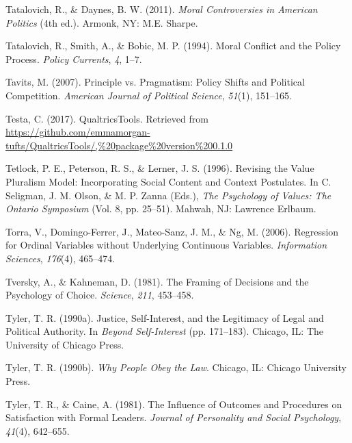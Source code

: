 \documentclass[12pt,econ]{sources/authesis}
\begin{document}
\leavevmode\hypertarget{ref-tatalovich_moral_2011}{}%
Tatalovich, R., \& Daynes, B. W. (2011). \emph{Moral Controversies in American Politics} (4th ed.). Armonk, NY: M.E. Sharpe.

\leavevmode\hypertarget{ref-tatalovich_moral_1994}{}%
Tatalovich, R., Smith, A., \& Bobic, M. P. (1994). Moral Conflict and the Policy Process. \emph{Policy Currents}, \emph{4}, 1--7.

\leavevmode\hypertarget{ref-tavits_2007_principle}{}%
Tavits, M. (2007). Principle vs. Pragmatism: Policy Shifts and Political Competition. \emph{American Journal of Political Science}, \emph{51}(1), 151--165.

\leavevmode\hypertarget{ref-testa_2017_qualtricstools}{}%
Testa, C. (2017). QualtricsTools. Retrieved from \url{https://github.com/emmamorgan-tufts/QualtricsTools/,\%20package\%20version\%200.1.0}

\leavevmode\hypertarget{ref-tetlock_1996_revising}{}%
Tetlock, P. E., Peterson, R. S., \& Lerner, J. S. (1996). Revising the Value Pluralism Model: Incorporating Social Content and Context Postulates. In C. Seligman, J. M. Olson, \& M. P. Zanna (Eds.), \emph{The Psychology of Values: The Ontario Symposium} (Vol. 8, pp. 25--51). Mahwah, NJ: Lawrence Erlbaum.

\leavevmode\hypertarget{ref-torra_2006_regression}{}%
Torra, V., Domingo-Ferrer, J., Mateo-Sanz, J. M., \& Ng, M. (2006). Regression for Ordinal Variables without Underlying Continuous Variables. \emph{Information Sciences}, \emph{176}(4), 465--474.

\leavevmode\hypertarget{ref-tversky_framing_1981}{}%
Tversky, A., \& Kahneman, D. (1981). The Framing of Decisions and the Psychology of Choice. \emph{Science}, \emph{211}, 453--458.

\leavevmode\hypertarget{ref-tyler_justice_1990}{}%
Tyler, T. R. (1990a). Justice, Self-Interest, and the Legitimacy of Legal and Political Authority. In \emph{Beyond Self-Interest} (pp. 171--183). Chicago, IL: The University of Chicago Press.

\leavevmode\hypertarget{ref-tyler_1990_people}{}%
Tyler, T. R. (1990b). \emph{Why People Obey the Law}. Chicago, IL: Chicago University Press.

\leavevmode\hypertarget{ref-tyler_1981_influence}{}%
Tyler, T. R., \& Caine, A. (1981). The Influence of Outcomes and Procedures on Satisfaction with Formal Leaders. \emph{Journal of Personality and Social Psychology}, \emph{41}(4), 642--655.
\end{document}
